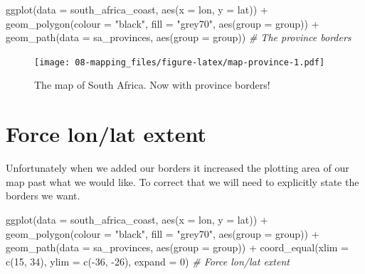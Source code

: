 \documentclass[
]{book}
\newenvironment{Shaded}{\begin{snugshade}}{\end{snugshade}}
\newcommand{\AttributeTok}[1]{\textcolor[rgb]{0.77,0.63,0.00}{#1}}
\newcommand{\CommentTok}[1]{\textcolor[rgb]{0.56,0.35,0.01}{\textit{#1}}}
\newcommand{\DecValTok}[1]{\textcolor[rgb]{0.00,0.00,0.81}{#1}}
\newcommand{\FunctionTok}[1]{\textcolor[rgb]{0.00,0.00,0.00}{#1}}
\newcommand{\NormalTok}[1]{#1}
\newcommand{\SpecialCharTok}[1]{\textcolor[rgb]{0.00,0.00,0.00}{#1}}
\newcommand{\StringTok}[1]{\textcolor[rgb]{0.31,0.60,0.02}{#1}}
\begin{document}
\begin{Shaded}
\begin{Highlighting}[]
\FunctionTok{ggplot}\NormalTok{(}\AttributeTok{data =}\NormalTok{ south\_africa\_coast, }\FunctionTok{aes}\NormalTok{(}\AttributeTok{x =}\NormalTok{ lon, }\AttributeTok{y =}\NormalTok{ lat)) }\SpecialCharTok{+}
  \FunctionTok{geom\_polygon}\NormalTok{(}\AttributeTok{colour =} \StringTok{"black"}\NormalTok{, }\AttributeTok{fill =} \StringTok{"grey70"}\NormalTok{, }\FunctionTok{aes}\NormalTok{(}\AttributeTok{group =}\NormalTok{ group)) }\SpecialCharTok{+}
  \FunctionTok{geom\_path}\NormalTok{(}\AttributeTok{data =}\NormalTok{ sa\_provinces, }\FunctionTok{aes}\NormalTok{(}\AttributeTok{group =}\NormalTok{ group)) }\CommentTok{\# The province borders}
\end{Highlighting}
\end{Shaded}

\begin{figure}
\centering
\texttt{[image: 08-mapping\_files/figure-latex/map-province-1.pdf]}
\caption{\label{fig:map-province}The map of South Africa. Now with province borders!}
\end{figure}

\hypertarget{force-lonlat-extent}{%
\section{Force lon/lat extent}\label{force-lonlat-extent}}

Unfortunately when we added our borders it increased the plotting area of our map past what we would like. To correct that we will need to explicitly state the borders we want.

\begin{Shaded}
\begin{Highlighting}[]
\FunctionTok{ggplot}\NormalTok{(}\AttributeTok{data =}\NormalTok{ south\_africa\_coast, }\FunctionTok{aes}\NormalTok{(}\AttributeTok{x =}\NormalTok{ lon, }\AttributeTok{y =}\NormalTok{ lat)) }\SpecialCharTok{+}
  \FunctionTok{geom\_polygon}\NormalTok{(}\AttributeTok{colour =} \StringTok{"black"}\NormalTok{, }\AttributeTok{fill =} \StringTok{"grey70"}\NormalTok{, }\FunctionTok{aes}\NormalTok{(}\AttributeTok{group =}\NormalTok{ group)) }\SpecialCharTok{+}
  \FunctionTok{geom\_path}\NormalTok{(}\AttributeTok{data =}\NormalTok{ sa\_provinces, }\FunctionTok{aes}\NormalTok{(}\AttributeTok{group =}\NormalTok{ group)) }\SpecialCharTok{+} 
  \FunctionTok{coord\_equal}\NormalTok{(}\AttributeTok{xlim =} \FunctionTok{c}\NormalTok{(}\DecValTok{15}\NormalTok{, }\DecValTok{34}\NormalTok{), }\AttributeTok{ylim =} \FunctionTok{c}\NormalTok{(}\SpecialCharTok{{-}}\DecValTok{36}\NormalTok{, }\SpecialCharTok{{-}}\DecValTok{26}\NormalTok{), }\AttributeTok{expand =} \DecValTok{0}\NormalTok{) }\CommentTok{\# Force lon/lat extent}
\end{Highlighting}
\end{Shaded}
\end{document}
